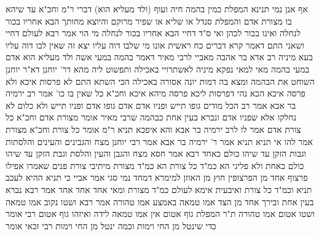 \documentclass[12pt, openany]{book}
\begin{document}
{אף אנן נמי תנינא  המפלת כמין בהמה חיה ועוף (ולד מעליא הוא) דברי ר"מ  וחכ"א  עד שיהא בו מצורת אדם 
והמפלת סנדל או שליא או שפיר מרוקם והיוצא מחותך הבא אחריו בכור לנחלה ואינו בכור לכהן  ואי ס"ד דחיי הבא אחריו בכור לנחלה מי הוי 
אמר רבא  לעולם דחיי ושאני התם דאמר קרא {דברים כח } ראשית אונו מי שלבו דוה עליו יצא זה שאין לבו דוה עליו 
בעא מיניה רב אדא בר אהבה מאביי  לרבי מאיר דאמר בהמה במעי אשה ולד מעליא הוא אדם במעי בהמה מאי  למאי נפקא מיניה לאשתרויי באכילה 
ותפשוט ליה מהא דר' יוחנן דא"ר יוחנן  השוחט את הבהמה ומצא בה דמות יונה אסורה באכילה 
הכי השתא  התם לא פרסות איכא ולא פרסה איכא הכא נהי דפרסות ליכא פרסה מיהא איכא
וחכ"א כל שאין בו כו' אמר רב ירמיה בר אבא אמר רב  הכל מודים גופו תייש ופניו אדם אדם גופו אדם ופניו תייש ולא כלום
לא נחלקו אלא שפניו אדם ונברא בעין אחת כבהמה  שרבי מאיר אומר  מצורת אדם  וחכ"א  כל צורת אדם 
אמר לו לרב ירמיה בר אבא  והא איפכא תניא ר"מ אומר  כל צורת וחכ"א  מצורת  אמר להו  אי תניא תניא 
אמר ר' ירמיה בר אבא אמר רבי יוחנן  מצח והגבינים והעינים והלסתות וגבות הזקן עד שיהו כולם כאחד  רבא אמר חסא  מצח והגבן והעין והלסת וגבת הזקן עד שיהו כולם כאחת 
ולא פליגי הא כמ"ד כל צורת הא כמ"ד מצורת 
מיתיבי  צורת פנים שאמרו אפילו פרצוף אחד מן הפרצופין חוץ מן האוזן  למימרא דמחד נמי סגי 
אמר אביי  כי תניא ההיא לעכב תניא וכמ"ד כל צורת  ואיבעית אימא  לעולם כמ"ד מצורת ומאי אחד אחד אחד 
אמר רבא  נברא בעין אחת ובירך אחד מן הצד אמו טמאה באמצע אמו טהורה 
אמר רבא  ושטו נקוב אמו טמאה ושטו אטום אמו טהורה 
ת"ר  המפלת גוף אטום אין אמו טמאה לידה  ואיזהו גוף אטום  רבי אומר  כדי שינטל מן החי וימות 
וכמה ינטל מן החי וימות  רבי זכאי אומר}
\end{document}
